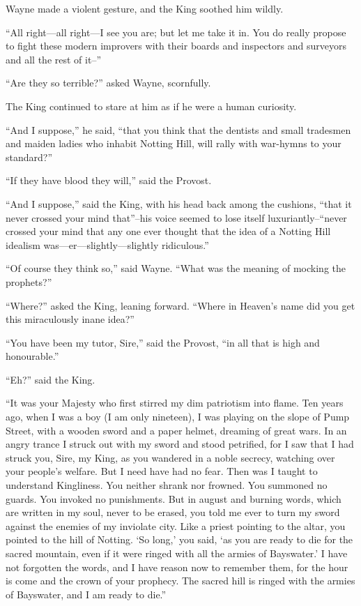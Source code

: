 \documentclass{book}
\begin{document}
Wayne made a violent gesture, and the King soothed him wildly.

“All right—all right—I see you are; but let me take it in. You do really propose to fight these modern improvers with their boards and inspectors and surveyors and all the rest of it–”

“Are they so terrible?” asked Wayne, scornfully.

The King continued to stare at him as if he were a human curiosity.

“And I suppose,” he said, “that you think that the dentists and small tradesmen and maiden ladies who inhabit Notting Hill, will rally with war-hymns to your standard?”

“If they have blood they will,” said the Provost.

“And I suppose,” said the King, with his head back among the cushions, “that it never crossed your mind that”–his voice seemed to lose itself luxuriantly–“never crossed your mind that any one ever thought that the idea of a Notting Hill idealism was—er—slightly—slightly ridiculous.”

“Of course they think so,” said Wayne. “What was the meaning of mocking the prophets?”

“Where?” asked the King, leaning forward. “Where in Heaven’s name did you get this miraculously inane idea?”

“You have been my tutor, Sire,” said the Provost, “in all that is high and honourable.”

“Eh?” said the King.

“It was your Majesty who first stirred my dim patriotism into flame. Ten years ago, when I was a boy (I am only nineteen), I was playing on the slope of Pump Street, with a wooden sword and a paper helmet, dreaming of great wars. In an angry trance I struck out with my sword and stood petrified, for I saw that I had struck you, Sire, my King, as you wandered in a noble secrecy, watching over your people’s welfare. But I need have had no fear. Then was I taught to understand Kingliness. You neither shrank nor frowned. You summoned no guards. You invoked no punishments. But in august and burning words, which are written in my soul, never to be erased, you told me ever to turn my sword against the enemies of my inviolate city. Like a priest pointing to the altar, you pointed to the hill of Notting. ‘So long,’ you said, ‘as you are ready to die for the sacred mountain, even if it were ringed with all the armies of Bayswater.’ I have not forgotten the words, and I have reason now to remember them, for the hour is come and the crown of your prophecy. The sacred hill is ringed with the armies of Bayswater, and I am ready to die.”
\end{document}
